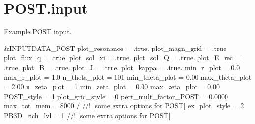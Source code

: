 \hypertarget{POST_8input-example}{}\section{P\+O\+S\+T.\+input}
Example P\+O\+ST input.


\begin{DoxyCodeInclude}
&INPUTDATA\_POST
    plot\_resonance          = .true.
    plot\_magn\_grid          = .true.
    plot\_flux\_q             = .true.
    plot\_sol\_xi             = .true.
    plot\_sol\_Q              = .true.
    plot\_E\_rec              = .true.
    plot\_B                  = .true.
    plot\_J                  = .true.
    plot\_kappa              = .true.
    min\_r\_plot              = 0.0
    max\_r\_plot              = 1.0
    n\_theta\_plot            = 101
    min\_theta\_plot          = 0.00
    max\_theta\_plot          = 2.00
    n\_zeta\_plot             = 1
    min\_zeta\_plot           = 0.00
    max\_zeta\_plot           = 0.00
    POST\_style              = 1
    plot\_grid\_style         = 0
    pert\_mult\_factor\_POST   = 0.0000
    max\_tot\_mem             = 8000
/
//! [some extra options for POST]
    ex\_plot\_style           = 2
    PB3D\_rich\_lvl           = 1
//! [some extra options for POST]
\end{DoxyCodeInclude}
 